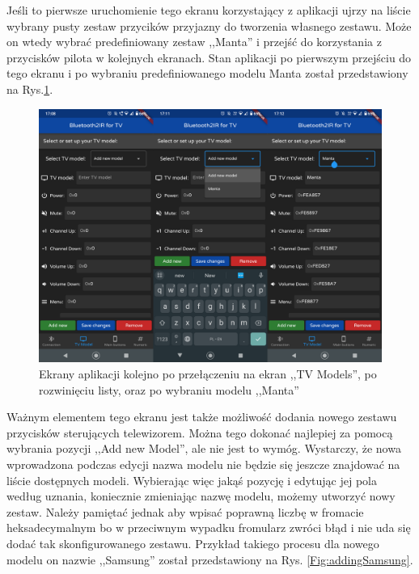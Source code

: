 \documentclass[12pt,twoside]{article}
\begin{document}
Jeśli to pierwsze uruchomienie tego ekranu korzystający z aplikacji ujrzy na liście wybrany pusty zestaw przycików przyjazny do tworzenia własnego zestawu. Może on wtedy wybrać predefiniowany zestaw ,,Manta'' i przejść do korzystania z przycisków pilota w kolejnych ekranach. Stan aplikacji po pierwszym przejściu do tego ekranu i po wybraniu predefiniowanego modelu Manta został przedstawiony na Rys.\ref*{Fig:choosingManta}.
\begin{figure}[ht]
   \centering
   \includegraphics[width=14cm]{images/choosingManta.png}
   \caption{Ekrany aplikacji kolejno po przełączeniu na ekran ,,TV Models'', po rozwinięciu listy, oraz po wybraniu modelu ,,Manta''}
   \label{Fig:choosingManta}
\end{figure}

Ważnym elementem tego ekranu jest także możliwość dodania nowego zestawu przycisków sterujących telewizorem. Można tego dokonać najlepiej za pomocą wybrania pozycji ,,Add new Model'', ale nie jest to wymóg. Wystarczy, że nowa wprowadzona podczas edycji nazwa modelu nie będzie się jeszcze znajdować na liście dostępnych modeli. Wybierając więc jakąś pozycję i edytując jej pola według uznania, koniecznie zmieniając nazwę modelu, możemy utworzyć nowy zestaw. Należy pamiętać jednak aby wpisać poprawną liczbę w fromacie heksadecymalnym bo w przeciwnym wypadku fromularz zwróci błąd i nie uda się dodać tak skonfigurowanego zestawu. Przykład takiego procesu dla nowego modelu on nazwie ,,Samsung'' został przedstawiony na Rys. \ref*{Fig:addingSamsung}.
\end{document}
